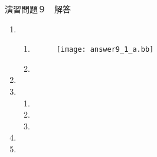 \documentclass{jarticle}
\begin{document}
\begin{center} {\Large 演習問題９　解答} \end{center}
  \begin{enumerate}
    \item
      \begin{enumerate}
        \item
          \begin{figure}
            \texttt{[image: answer9\_1\_a.bb]}
          \end{figure}
        \item
      \end{enumerate}
    \item
    \item
      \begin{enumerate}
        \item
        \item
        \item
      \end{enumerate}
    \item
    \item
  \end{enumerate}
\end{document}
